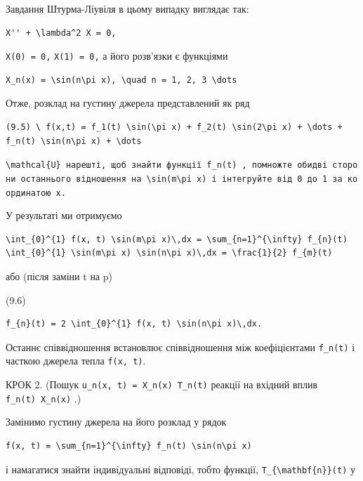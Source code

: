 \documentclass[
  ukrainian,
]{article}
\begin{document}
Завдання Штурма-Ліувіля в цьому випадку виглядає так:

\begin{verbatim}
X'' + \lambda^2 X = 0,
\end{verbatim}

\texttt{X(0)\ =\ 0,} \texttt{X(1)\ =\ 0,} а його розв'язки є функціями

\begin{verbatim}
X_n(x) = \sin(n\pi x), \quad n = 1, 2, 3 \dots
\end{verbatim}

Отже, розклад на густину джерела представлений як ряд

\begin{verbatim}
(9.5) \ f(x,t) = f_1(t) \sin(\pi x) + f_2(t) \sin(2\pi x) + \dots + f_n(t) \sin(n\pi x) + \dots
\end{verbatim}

\texttt{\textquotesingle{}\textbackslash{}mathcal\{U\}\textquotesingle{}\ нарешті,\ щоб\ знайти\ функції\ \textquotesingle{}f\_n(t)\textquotesingle{}\ ,\ помножте\ обидві\ сторони\ останнього\ відношення\ на\ \textquotesingle{}\textbackslash{}sin(m\textbackslash{}pi\ x)\textquotesingle{}\ і\ інтегруйте\ від\ 0\ до\ 1\ за\ координатою\ x.}

У результаті ми отримуємо

\begin{verbatim}
\int_{0}^{1} f(x, t) \sin(m\pi x)\,dx = \sum_{n=1}^{\infty} f_{n}(t) \int_{0}^{1} \sin(m\pi x) \sin(n\pi x)\,dx = \frac{1}{2} f_{m}(t)
\end{verbatim}

або (після заміни t на p)

(9.6)

\begin{verbatim}
f_{n}(t) = 2 \int_{0}^{1} f(x, t) \sin(n\pi x)\,dx.
\end{verbatim}

Останнє співвідношення встановлює співвідношення між коефіцієнтами
\texttt{f\_n(t)} і часткою джерела тепла \texttt{f(x,\ t)}.

КРОК 2. (Пошук \texttt{u\_n(x,\ t)\ =\ X\_n(x)\ T\_n(t)} реакції на
вхідний вплив \texttt{f\_n(t)\ X\_n(x)} .)

Замінимо густину джерела на його розклад у рядок

\begin{verbatim}
f(x, t) = \sum_{n=1}^{\infty} f_n(t) \sin(n\pi x)
\end{verbatim}

і намагатися знайти індивідуальні відповіді, тобто функції,
\texttt{T\_\{\textbackslash{}mathbf\{n\}\}(t)} у
\end{document}
